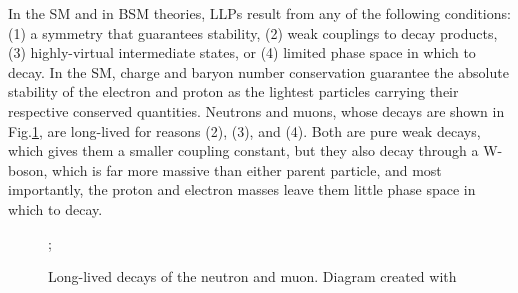 \documentclass[12pt]{article}
\begin{document}
    In the SM and in BSM theories, LLPs result from any of the following conditions: (1) a symmetry that guarantees stability, (2) weak couplings to decay products, (3) highly-virtual intermediate states, or (4) limited phase space in which to decay. In the SM, charge and baryon number conservation guarantee the absolute stability of the electron and proton as the lightest particles carrying their respective conserved quantities. Neutrons and muons, whose decays are shown in Fig.\ref{sm_llp_processes}, are long-lived for reasons (2), (3), and (4). Both are pure weak decays, which gives them a smaller coupling constant, but they also decay through a W-boson, which is far more massive than either parent particle, and most importantly, the proton and electron masses leave them little phase space in which to decay. 

        \noindent \begin{figure}[htbp] \begin{center}
            \qquad\qquad
            ;
            \caption{Long-lived decays of the neutron and muon. Diagram created with~\cite{tikz}}
            \label{sm_llp_processes}
        \end{center} \end{figure}
\end{document}
